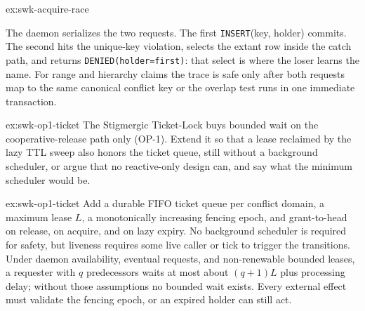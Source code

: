 \documentclass[11pt,a4paper]{article}
\theoremstyle{definition}
\theoremstyle{remark}
\begin{document}
\begin{pdsolution}{ex:swk-acquire-race}
\begin{center}
\end{center}
\par\smallskip
The daemon serializes the two requests. The first \texttt{INSERT}\allowbreak(key, holder) commits. The second hits the unique-key violation, selects the extant row inside the catch path, and returns \texttt{DENIED}\allowbreak\texttt{(holder}\allowbreak\texttt{=first)}: that select is where the loser learns the name. For range and hierarchy claims the trace is safe only after both requests map to the same canonical conflict key or the overlap test runs in one immediate transaction.
\end{pdsolution}
\begin{pdexercise}[kind=Open,rating=3]{ex:swk-op1-ticket}
The Stigmergic Ticket-Lock buys bounded wait on the cooperative-release path only (OP-1). Extend it so that a lease reclaimed by the lazy TTL sweep also honors the ticket queue, still without a background scheduler, or argue that no reactive-only design can, and say what the minimum scheduler would be.
\end{pdexercise}
\begin{pdsolution}{ex:swk-op1-ticket}
Add a durable FIFO ticket queue per conflict domain, a maximum lease $L$, a monotonically increasing fencing epoch, and grant-to-head on release, on acquire, and on lazy expiry. No background scheduler is required for safety, but liveness requires some live caller or tick to trigger the transitions. Under daemon availability, eventual requests, and non-renewable bounded leases, a requester with $q$ predecessors waits at most about $(q+1)L$ plus processing delay; without those assumptions no bounded wait exists. Every external effect must validate the fencing epoch, or an expired holder can still act.
\end{pdsolution}

\end{document}
